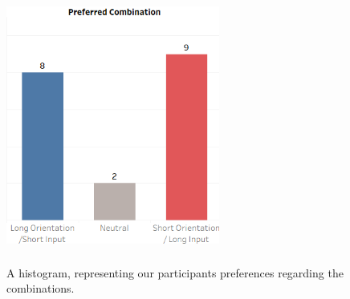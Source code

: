 \begin{figure}[t!]
\centering
\includegraphics[width=7cm, height=9cm]{Chapters/graphics/preference.png}
\caption{A histogram, representing our participants preferences regarding the combinations.}
\label{fig:preference}
\end{figure}

